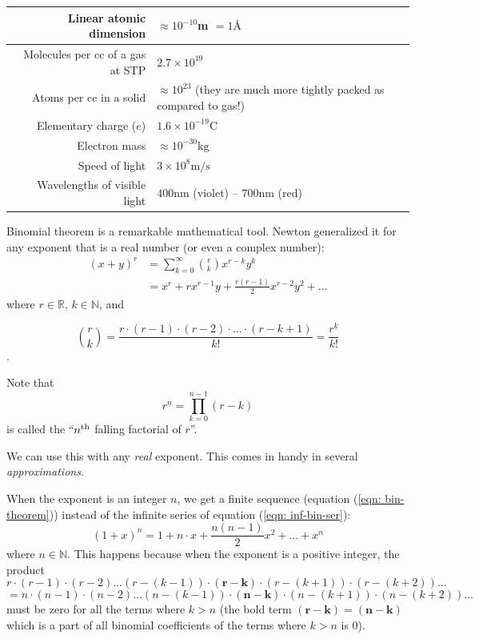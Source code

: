 \documentclass[12pt,a4paper]{book}
\begin{document}
\begin{longtable}{|r|l|}
 \hline
    Linear atomic dimension&
    $\approx 10^{-10}$\si{m} $=1\si{\angstrom} $\\
 \hline
    Molecules per cc of a gas at STP &
    $2.7\times10^{19}$ \\
 \hline
    Atoms per cc in a solid &
    \makecell{$\approx 10^{23}$ (they are much more tightly packed \\
    as compared to gas!)} \\
 \hline
    Elementary charge ($e$) &
    $1.6\times 10^{-19}\si{\coulomb}$ \\
 \hline
    Electron mass &
    $\approx 10^{-30}\si{\kilo\gram}$ \\
 \hline
    Speed of light &
    $3\times 10^{8}\si{\metre\per\second}$ \\
 \hline
    Wavelengths of visible light &
    $400\si{\nano\metre}$ (violet) -- $700\si{\nano\metre}$ (red) \\
 \hline

\end{longtable}

Binomial theorem is a remarkable mathematical tool. Newton generalized it for any exponent that is a real number \cite{newton-bt} (or even a complex number):
\begin{align}
    (x+y)^{r} 
        &= \sum_{k=0}^{\infty} \binom{r}{k}x^{r-k}y^{k} \\
        &= x^r + rx^{r-1}y+\frac{r(r-1)}{2}x^{r-2}y^2+\dots \label{eqn: inf-bin-ser}
\end{align}
where $ r \in \mathbb{R}$, $k \in \mathbb{N}$, and 

$$
\binom{r}{k} 
= \frac{r\cdot(r-1)\cdot(r-2)\cdot\dots\cdot(r-k+1)}{k!}
= \frac{r^{\underline{k}}}{k!}
$$
.

Note that 
$$
r^{\underline{n}} = \prod_{k=0}^{n-1}(r-k)
$$
is called the ``$n\textsuperscript{th}$ falling factorial of $r$''.




We can use this with any \emph{real} exponent. This comes in handy in several \emph{approximations}.

When the exponent is an integer $n$, we get a finite sequence (equation (\ref{eqn: bin-theorem})) instead of the infinite series of equation (\ref{eqn: inf-bin-ser}):
\begin{equation}
    \label{eqn: bin-theorem}
(1 + x)^{n} = 1+n\cdot x + \frac{n(n-1)}{2}x^{2} +\dots + x^{n}
\end{equation}
where $n \in \mathbb{N}$. This happens because when the exponent is a positive integer, the product 
$$r
\cdot(r-1)\cdot(r-2)\dots(r-(k-1))\cdot\pmb{(r-k)}\cdot(r-(k+1))\cdot(r-(k+2))\dots
$$ 
$$
=n\cdot(n-1)\cdot(n-2)\dots(n-(k-1))\cdot\pmb{(n-k)}\cdot(n-(k+1))\cdot(n-(k+2))\dots
$$ 
must be zero for all the terms where $k > n$ (the bold term $\pmb{(r-k) = (n-k)}$ which is a part of all binomial coefficients of the terms where $k > n$ is 0).
\end{document}
